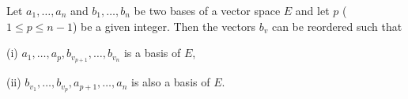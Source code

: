 Let $a_1, \dots, a_n$ and $b_1, \dots, b_n$ be two bases of a vector space $E$ and let $p$ ($1 \leq p \leq n-1$) be a given integer. Then the vectors $b_v$ can be reordered such that

(i) $a_1, \dots, a_p, b_{v_{p+1}}, \dots, b_{v_n}$ is a basis of $E$,

(ii) $b_{v_1}, \dots, b_{v_p}, a_{p+1}, \dots, a_n$ is also a basis of $E$.
